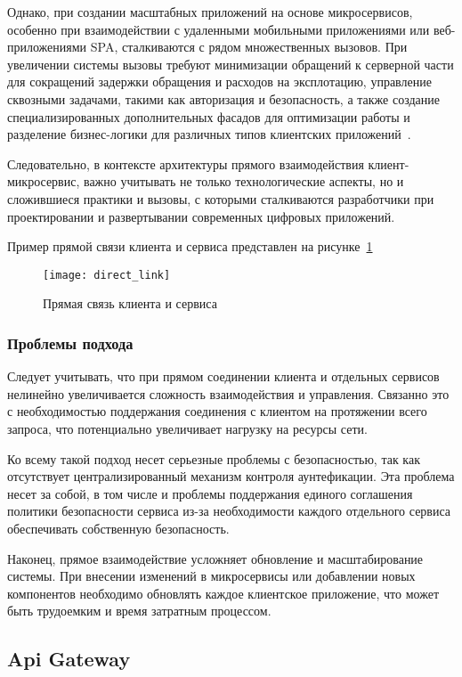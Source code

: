 Однако, при создании масштабных приложений на основе микросервисов, особенно при взаимодействии с
удаленными мобильными приложениями или веб-приложениями SPA, сталкиваются с
рядом множественных вызовов.
При увеличении системы
вызовы требуют минимизации обращений к серверной части для сокращений задержки обращения и расходов
на эксплотацию,
управление сквозными задачами, такими как авторизация и безопасность, а также создание
специализированных дополнительных фасадов для оптимизации работы и разделение бизнес-логики для
различных типов клиентских приложений~\cite{ApiGatewayDirect}.

Следовательно, в контексте архитектуры прямого взаимодействия клиент-микросервис, важно учитывать не
только технологические аспекты, но и сложившиеся практики и вызовы, с которыми сталкиваются
разработчики при проектировании и развертывании современных цифровых приложений.

Пример прямой связи клиента и сервиса представлен на рисунке~\ref{fig:direct_link}

\begin{figure}[htbp]
    \centering
    \texttt{[image: direct\_link]}
    \caption{Прямая связь клиента и сервиса}
    \label{fig:direct_link}
\end{figure}

\subsubsection{Проблемы подхода}

Следует учитывать, что при прямом соединении клиента и отдельных сервисов нелинейно увеличивается
сложность взаимодействия и управления.
Связанно это с необходимостью поддержания соединения с
клиентом на протяжении всего запроса, что потенциально увеличивает нагрузку на ресурсы сети.

Ко всему такой подход несет серьезные проблемы с безопасностью, так как отсутствует
централизированный
механизм контроля аунтефикации.
Эта проблема несет за собой, в том числе и проблемы поддержания
единого соглашения политики безопасности сервиса из-за необходимости каждого отдельного сервиса
обеспечивать собственную безопасность.

Наконец, прямое взаимодействие усложняет обновление и масштабирование системы.
При внесении
изменений в микросервисы или добавлении новых компонентов необходимо обновлять каждое клиентское
приложение, что может быть трудоемким и время затратным процессом.

\subsection{Api Gateway}

